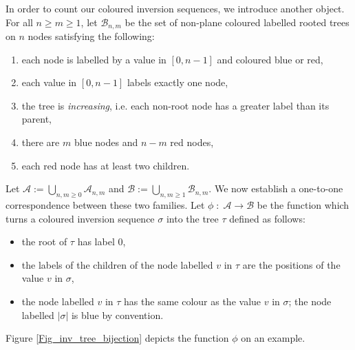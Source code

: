 \documentclass[a4paper,11pt]{article}
\theoremstyle{definition}
\theoremstyle{remark}
\begin{document}
In order to count our coloured inversion sequences, we introduce another object.
For all $n \geq m \geq 1$, let $\mathcal B_{n,m}$ be the set of non-plane coloured labelled rooted trees on $n$ nodes satisfying the following:
\begin{enumerate}
    \item each node is labelled by a value in $[0,n-1]$ and coloured blue or red,
    \item each value in $[0,n-1]$ labels exactly one node,
    \item the tree is \emph{increasing}, i.e. each non-root node has a greater label than its parent,
    \item there are $m$ blue nodes and $n-m$ red nodes,
    \item each red node has at least two children.
\end{enumerate}

Let $\mathcal A := \bigcup_{n,m \geq 0} \mathcal A_{n,m}$ and $\mathcal B := \bigcup_{n,m \geq 1} \mathcal B_{n,m}$. We now establish a one-to-one correspondence between these two families.
Let $\phi \; : \; \mathcal A \to \mathcal B$ 
be the function which turns a coloured inversion sequence $\sigma$ into the tree $\tau$ defined as follows:
\begin{itemize}
    \item the root of $\tau$ has label $0$,
    \item the labels of the children of the node labelled $v$ in $\tau$ are the positions of the value $v$ in $\sigma$,
    \item the node labelled $v$ in $\tau$ has the same colour as the value $v$ in $\sigma$; the node labelled $|\sigma|$ is blue by convention.
\end{itemize}
Figure \ref{Fig_inv_tree_bijection} depicts the function $\phi$ on an example.
\end{document}
